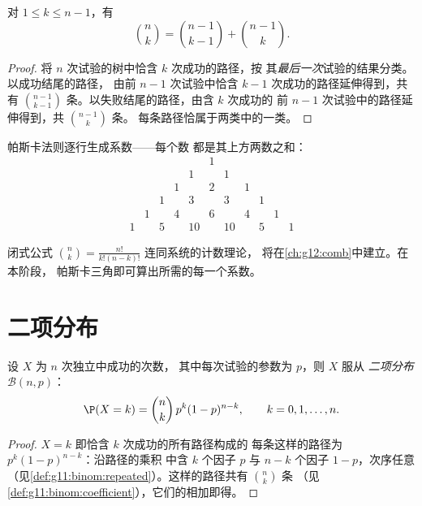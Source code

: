 \begin{proposition}[帕斯卡法则]\label{prop:g11:binom:pascal}
对 $1 \leq k \leq n - 1$，有
\[
\binom{n}{k} = \binom{n-1}{k-1} + \binom{n-1}{k}.
\]
\end{proposition}

\begin{proof}
将 $n$ 次试验的树中恰含 $k$ 次成功的路径，按
其\emph{最后一次}试验的结果分类。以成功结尾的路径，
由前 $n-1$ 次试验中恰含 $k - 1$ 次成功的路径延伸得到，共有
$\binom{n-1}{k-1}$ 条。以失败结尾的路径，由含 $k$ 次成功的
前 $n-1$ 次试验中的路径延伸得到，共 $\binom{n-1}{k}$ 条。
每条路径恰属于两类中的一类。
\end{proof}

帕斯卡法则逐行生成系数——每个数
都是其上方两数之和：
\[
\begin{array}{ccccccccccc}
&&&&&1&&&&&\\
&&&&1&&1&&&&\\
&&&1&&2&&1&&&\\
&&1&&3&&3&&1&&\\
&1&&4&&6&&4&&1&\\
1&&5&&10&&10&&5&&1
\end{array}
\]

\begin{remark}
闭式公式 $\binom nk = \frac{n!}{k!(n-k)!}$ 连同系统的计数理论，
将在\cref{ch:g12:comb}中建立。在本阶段，
帕斯卡三角即可算出所需的每一个系数。
\end{remark}

\section{二项分布}

\begin{theorem}[二项分布]\label{thm:g11:binom:binomial}
设 $X$ 为 $n$ 次独立中成功的次数，
其中每次试验的参数为 $p$，则 $X$ 服从
\emph{二项分布} $\mathcal B(n, p)$：
\[
\P(X = k) = \binom{n}{k}\, p^k (1-p)^{n-k},
\qquad k = 0, 1, \dots, n .
\]
\end{theorem}

\begin{proof}
 $X = k$ 即恰含 $k$ 次成功的所有路径构成的
每条这样的路径为 $p^k(1-p)^{n-k}$：沿路径的乘积
中含 $k$ 个因子 $p$ 与 $n - k$ 个因子 $1-p$，次序任意
（见\cref{def:g11:binom:repeated}）。这样的路径共有 $\binom nk$ 条
（见\cref{def:g11:binom:coefficient}），它们的相加即得。
\end{proof}

